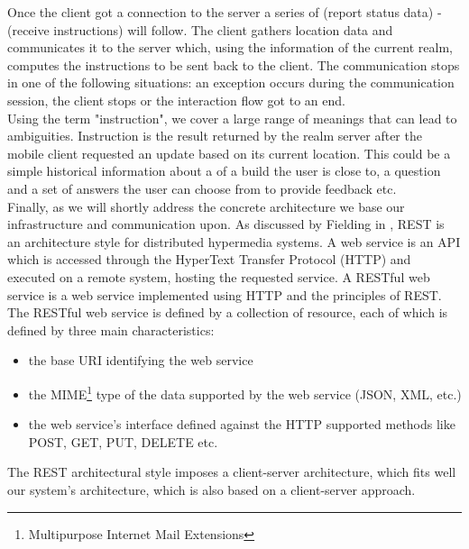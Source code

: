 Once the client got a connection to the server a series of (report status data) - (receive instructions) will follow. The client gathers location data and communicates it to the server which, using the information of the current realm, computes the instructions to be sent back to the client. The communication stops in one of the following situations: an exception occurs during the communication session, the client stops or the interaction flow got to an end.
\\

Using the term "instruction", we cover a large range of meanings that can lead to ambiguities. Instruction is the result returned by the realm server after the mobile client requested an update based on its current location. This could be a simple historical information about a of a build the user is close to, a question and a set of answers the user can choose from to provide feedback etc.
\\

Finally, as we will shortly address the concrete architecture we base our infrastructure and communication upon. As discussed by Fielding in \cite{Fielding:2000}, REST is an architecture style for distributed hypermedia systems. A web service is an API which is accessed through the HyperText Transfer Protocol (HTTP) and executed on a remote system, hosting the requested service. A RESTful web service is a web service implemented using HTTP and the principles of REST. The RESTful web service is defined by a collection of resource, each of which is defined by three main characteristics:
\begin{itemize}
  \item the base URI identifying the web service
  \item the MIME\footnote{Multipurpose Internet Mail Extensions} type of the
  data supported by the web service (JSON, XML, etc.)
  \item the web service's interface defined against the HTTP supported methods
  like POST, GET, PUT, DELETE etc.
\end{itemize}
The REST architectural style imposes a client-server architecture, which fits well our system's architecture, which is also based on a client-server approach.

